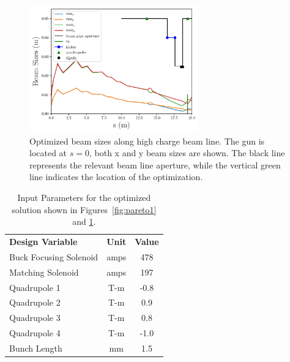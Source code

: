 \begin{figure}
	\includegraphics[width=0.65\textwidth]{xy-max-min-sigma-paper}
	\caption{Optimized beam sizes along high charge beam line. The gun is located at $s=0$, 
	both x and y beam sizes are shown. The black line represents the relevant beam line aperture, while
	the vertical green line indicates the location of the optimization.}
	\label{fig:stat}
\end{figure}
\begin{table}%
	\begin{center}
		\caption{Input Parameters for the optimized solution shown in Figures~\ref{fig:pareto1} and \ref{fig:stat}.}
		\label{tab:designopt}  
		\vspace{1em} 
		\begin{tabular}{l|c|c}
			\cline{1-3}
			\textbf{Design Variable} \qquad \qquad & \textbf{Unit}	\quad&  \textbf{Value}  \\ 
			\cline{1-3}
			{Buck Focusing Solenoid} \qquad \qquad & amps	\quad & 478 \\
			Matching Solenoid &	amps	& 197	  \\
			Quadrupole 1& T-m		& -0.8	\\ 
			Quadrupole 2& T-m		& 0.9	\\
			Quadrupole 3 & T-m		& 0.8	\\
			Quadrupole 4 & T-m		& -1.0	\\ 
			Bunch Length & mm 		& 1.5	\\
			\cline{1-3}
		\end{tabular}
	\end{center}
\end{table}









